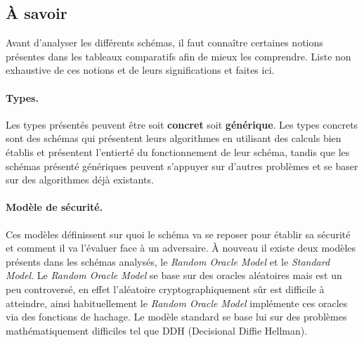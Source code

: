 \subsection{À savoir}
\label{subsec:asavoir}
Avant d'analyser les différents schémas, il faut connaître certaines notions présentes dans les tableaux comparatifs afin de mieux les comprendre. Liste non exhaustive de ces notions et de leurs significations et faites ici.
\paragraph*{Types.}Les types présentés peuvent être soit \textbf{concret} soit \textbf{générique}. Les types concrets sont des schémas qui présentent leurs algorithmes en utilisant des calculs bien établis et présentent l'entierté du fonctionnement de leur schéma, tandis que les schémas présenté génériques peuvent s'appuyer sur d'autres problèmes et se baser sur des algorithmes déjà existants.\\
\paragraph*{Modèle de sécurité.} Ces modèles définissent sur quoi le schéma va se reposer pour établir sa sécurité et comment il va l'évaluer face à un adversaire. À nouveau il existe deux modèles présents dans les schémas analysés, le \textit{Random Oracle Model} et le \textit{Standard Model}. Le \textit{Random Oracle Model} se base sur des oracles aléatoires mais est un peu controversé, en effet l'aléatoire cryptographiquement sûr est difficile à atteindre, ainsi habituellement le \textit{Random Oracle Model} implémente ces oracles via des fonctions de hachage. Le modèle standard se base lui sur des problèmes mathématiquement difficiles tel que DDH (Decisional Diffie Hellman). \\
